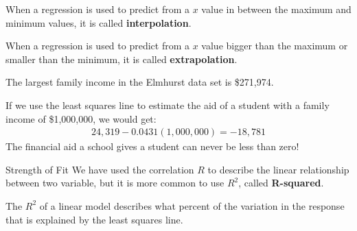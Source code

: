\documentclass{beamer}
\begin{document}
\begin{frame}
  \begin{definition}
    When a regression is used to predict from a $x$ value in between the maximum and minimum values, it is called \textbf{interpolation}.
  \end{definition}\pause

  \begin{definition}
    When a regression is used to predict from a $x$ value bigger than the maximum or smaller than the minimum, it is called \textbf{extrapolation}. 
  \end{definition}\pause

  \begin{example}
    The largest family income in the Elmhurst data set is \$271,974.\pause

    \vspace{1mm}
    If we use the least squares line to estimate the aid of a student with a family income of \$1,000,000, we would get:
    \begin{equation*}
      \begin{aligned}
        24,319 - 0.0431 (1,000,000) = -18,781
      \end{aligned}
    \end{equation*}\pause
    The financial aid a school gives a student can never be less than zero!
  \end{example}
\end{frame}

\begin{frame}
  \begin{block}{Strength of Fit}
    We have used the correlation $R$ to describe the linear relationship between two variable, but it is more common to use $R^2$, called \textbf{R-squared}.\pause

    \vspace{2mm}
    The $R^2$ of a linear model describes what percent of the variation in the response that is explained by the least squares line.
  \end{block}
\end{frame}
\end{document}
